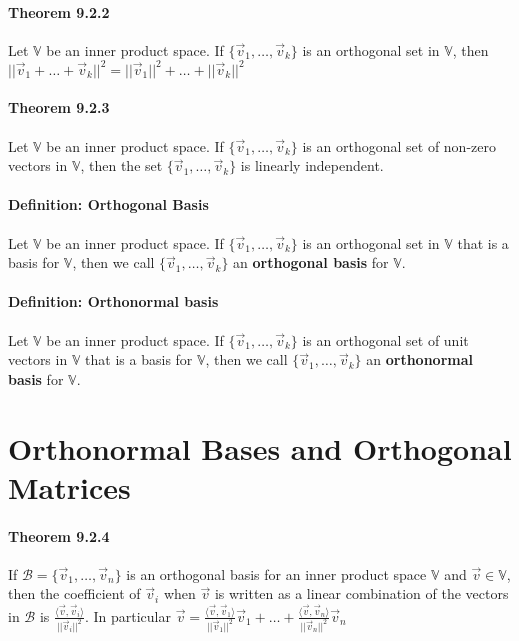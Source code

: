\documentclass[10pt,letter]{article}
\begin{document}
\paragraph{Theorem 9.2.2}
Let $\mathbb{V}$ be an inner product space. If $\{\vec{v}_1,\ldots,\vec{v}_k\}$ is an orthogonal set in $\mathbb{V}$, then $||\vec{v}_1+\ldots+\vec{v}_k||^2=||\vec{v}_1||^2+\ldots+||\vec{v}_k||^2$

\paragraph{Theorem 9.2.3}
Let $\mathbb{V}$ be an inner product space. If $\{\vec{v}_1,\ldots,\vec{v}_k\}$ is an orthogonal set of non-zero vectors in $\mathbb{V}$, then the set $\{\vec{v}_1,\ldots,\vec{v}_k\}$ is linearly independent. 

\paragraph{Definition: Orthogonal Basis}
Let $\mathbb{V}$ be an inner product space. If $\{\vec{v}_1,\ldots,\vec{v}_k\}$ is an orthogonal set in $\mathbb{V}$ that is a basis for $\mathbb{V}$, then we call $\{\vec{v}_1,\ldots,\vec{v}_k\}$ an \textbf{orthogonal basis} for $\mathbb{V}$. 
\paragraph{Definition: Orthonormal basis}
Let $\mathbb{V}$ be an inner product space. If $\{\vec{v}_1,\ldots,\vec{v}_k\}$ is an orthogonal set of unit vectors in $\mathbb{V}$ that is a basis for $\mathbb{V}$, then we call $\{\vec{v}_1,\ldots,\vec{v}_k\}$ an \textbf{orthonormal basis} for $\mathbb{V}$.

\section*{Orthonormal Bases and Orthogonal Matrices}
\paragraph{Theorem 9.2.4}
If $\mathcal{B}=\{\vec{v}_1,\ldots,\vec{v}_n\}$ is an orthogonal basis for an inner product space $\mathbb{V}$ and $\vec{v}\in\mathbb{V}$, then the coefficient of $\vec{v}_i$ when $\vec{v}$ is written as a linear combination of the vectors in $\mathcal{B}$ is $\frac{\langle\vec{v},\vec{v}_i\rangle}{||\vec{v}_i||^2}$. In particular $\vec{v}=\frac{\langle\vec{v},\vec{v}_1\rangle}{||\vec{v}_1||^2}\vec{v}_1+\ldots+\frac{\langle\vec{v},\vec{v}_n\rangle}{||\vec{v}_n||^2}\vec{v}_n$
\end{document}
